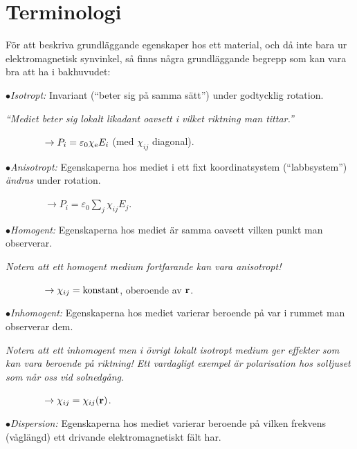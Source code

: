 \section{Terminologi}
F{\"o}r att beskriva grundl{\"a}ggande egenskaper hos ett material, och d{\aa}
inte bara ur elektromagnetisk synvinkel, s{\aa} finns n{\aa}gra
grundl{\"a}ggande begrepp som kan vara bra att ha i bakhuvudet:
\medskip
\item{$\bullet$}{{\it Isotropt:} Invariant (``beter sig p{\aa} samma s{\"a}tt'')
under godtycklig rotation.
      }
\item{}{{\it ``Mediet beter sig lokalt likadant oavsett i vilket riktning man
      tittar.''}}
\smallskip
\item{}{$\displaystyle \qquad\qquad
    \to P_i=\varepsilon_0\chi_{\rm e}E_i$\hskip20pt (med $\chi_{ij}$ diagonal).}
\smallskip
\item{$\bullet$}{{\it Anisotropt:} Egenskaperna hos mediet i ett fixt
      koordinatsystem (``labbsystem'') {\it {\"a}ndras} under rotation.
      }
\smallskip
\item{}{$\displaystyle \qquad\qquad\to P_i=\varepsilon_0\sum_{j}\chi_{ij}E_j$.}
\smallskip
\item{$\bullet$}{{\it Homogent:} Egenskaperna hos mediet {\"a}r samma oavsett
      vilken punkt man observerar.}
\item{}{{\it Notera att ett homogent medium fortfarande kan vara anisotropt!}}
\smallskip
\item{}{$\displaystyle \qquad\qquad\to \chi_{ij}=\hbox{konstant}$,
      oberoende av ${\bf r}$.}
\smallskip
\item{$\bullet$}{{\it Inhomogent:} Egenskaperna hos mediet varierar
      beroende p{\aa} var i rummet man observerar dem.}
\item{}{{\it Notera att ett inhomogent men i {\"o}vrigt lokalt isotropt
      medium ger effekter som kan vara beroende p{\aa} riktning!
      Ett vardagligt exempel {\"a}r polarisation hos solljuset som n{\aa}r
      oss vid solnedg{\aa}ng.}}
\smallskip
\item{}{$\displaystyle \qquad\qquad\to \chi_{ij}=\chi_{ij}({\bf r})$.}
\smallskip
\item{$\bullet$}{{\it Dispersion:} Egenskaperna hos mediet varierar beroende
      p{\aa} vilken frekvens (v{\aa}gl{\"a}ngd) ett drivande elektromagnetiskt
      f{\"a}lt har.}

